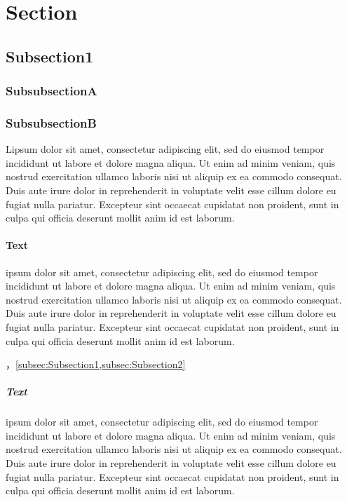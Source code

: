 \section{Section}

\subsection{Subsection1}

\subsubsection{SubsubsectionA}

\subsubsection{SubsubsectionB}

Lipsum dolor sit amet, consectetur adipiscing elit, sed do eiusmod tempor incididunt ut labore et dolore magna aliqua. Ut enim ad minim veniam, quis nostrud exercitation ullamco laboris nisi ut aliquip ex ea commodo consequat. Duis aute irure dolor in reprehenderit in voluptate velit esse cillum dolore eu fugiat nulla pariatur. Excepteur sint occaecat cupidatat non proident, sunt in culpa qui officia deserunt mollit anim id est laborum.

\paragraph{Text}

ipsum dolor sit amet, consectetur adipiscing elit, sed do eiusmod tempor incididunt ut labore et dolore magna aliqua. Ut enim ad minim veniam, quis nostrud exercitation ullamco laboris nisi ut aliquip ex ea commodo consequat. Duis aute irure dolor in reprehenderit in voluptate velit esse cillum dolore eu fugiat nulla pariatur. Excepteur sint occaecat cupidatat non proident, sunt in culpa qui officia deserunt mollit anim id est laborum.

，\cref{subsec:Subsection1,subsec:Subsection2}

\subparagraph{Text}

ipsum dolor sit amet, consectetur adipiscing elit, sed do eiusmod tempor incididunt ut labore et dolore magna aliqua. Ut enim ad minim veniam, quis nostrud exercitation ullamco laboris nisi ut aliquip ex ea commodo consequat. Duis aute irure dolor in reprehenderit in voluptate velit esse cillum dolore eu fugiat nulla pariatur. Excepteur sint occaecat cupidatat non proident, sunt in culpa qui officia deserunt mollit anim id est laborum.

